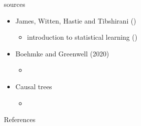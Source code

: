 \documentclass[aspectratio=169]{beamer}
\begin{document}
	\begin{frame}{sources}
		\begin{itemize}
			\item James, Witten, Hastie and Tibshirani (\citeyear{James2013})
			\begin{itemize}
				\item introduction to statistical learning (\href{https://www.edx.org/course/statistical-learning}{\underline{}})
			\end{itemize}
			\item Boehmke and Greenwell (2020)
			\begin{itemize}
				\item \href{https://bradleyboehmke.github.io/HOML/}{\underline{}}
			\end{itemize}
			\item Causal trees
			\begin{itemize}
				\item \href{https://grf-labs.github.io/grf/}{\underline{}}
			\end{itemize}
		\end{itemize}
	\end{frame}



	\begin{frame}[t, allowframebreaks]{References}
	  \printbibliography
	\end{frame}

%
\end{document}
